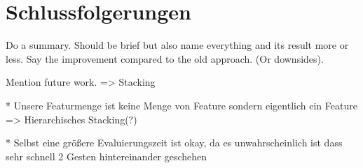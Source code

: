\chapter{Schlussfolgerungen}
Do a summary. Should be brief but also name everything and its result more or less.
Say the improvement compared to the old approach. (Or downsides).

Mention future work. => Stacking

* Unsere Featurmenge ist keine Menge von Feature sondern eigentlich ein Feature
    => Hierarchisches Stacking(?)

* Selbst eine größere Evaluierungszeit ist okay, da es unwahrscheinlich ist dass sehr schnell 2 Gesten hintereinander geschehen